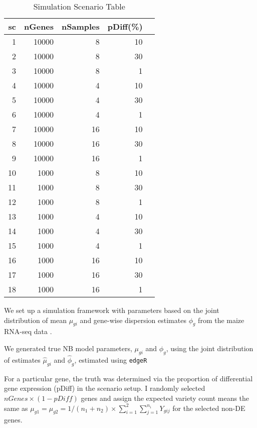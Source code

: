 \begin{table}[H]
\centering
\begin{tabular}{|r|r|r|r|r|}
\hline
sc & nGenes & nSamples & pDiff(\%) \\ 
\hline
1 & 10000 & 8 & 10 \\ 
\hline
2 & 10000 & 8 & 30 \\ 
\hline
3 & 10000 & 8 & 1 \\
\hline
4 & 10000 & 4 & 10 \\
\hline
5 & 10000 & 4 & 30 \\
\hline
6 & 10000 & 4 & 1 \\ 
\hline
7 & 10000 & 16 & 10 \\
\hline
8 & 10000 & 16 & 30 \\ 
\hline
9 & 10000 & 16 & 1 \\
\hline
10& 1000 & 8 & 10 \\
\hline
11 & 1000 & 8 & 30 \\
\hline
12 & 1000 & 8 & 1 \\ 
\hline
13 & 1000 & 4 & 10 \\
\hline
14 & 1000 & 4 & 30 \\
\hline
15 & 1000 & 4 & 1 \\ 
\hline
16 & 1000 & 16 & 10 \\
\hline
17 & 1000 & 16 & 30 \\ 
\hline
18 & 1000 & 16 & 1 \\ 
\hline
\end{tabular}
\caption{Simulation Scenario Table}
\label{tab:Scenario}
\end{table}


We set up a simulation framework with parameters based on the joint distribution of mean $\mu_{gi}$ and gene-wise dispersion estimates $\phi_g$ from the maize RNA-seq data \citep{paschold2012complementation}.

We generated true NB model parameters, $\mu_{gi}$ and $\phi_g$, using the joint distribution of estimates $\hat{\mu}_{gi}$ and $\hat{\phi}_g$, estimated using {\tt edgeR}


For a particular gene, the truth was determined via the proportion of differential gene expression (pDiff) in the scenario setup. I randomly selected $nGenes \times (1-pDiff)$ genes and assign the expected variety count means the same as $\mu_{g1} = \mu_{g2} = 1/(n_1+n_2)\times \sum_{i=1}^2 \sum_{j=1}^{n_i} Y_{gij}$ for the selected non-DE genes. 








